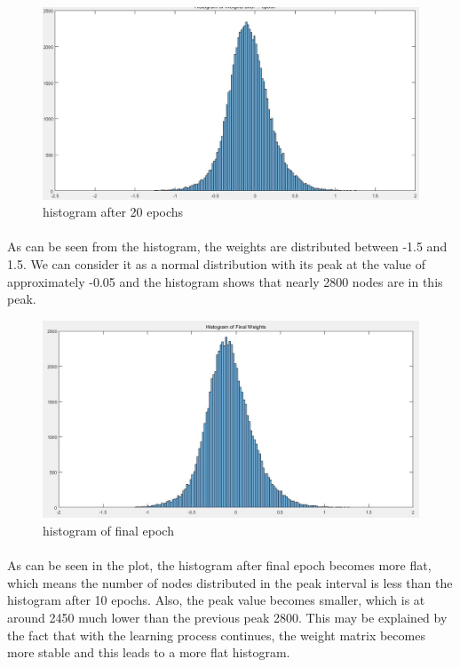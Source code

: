 \documentclass{article}
\begin{document}
 \begin{figure}[H]
 \centering
 \includegraphics[width=1.2\textwidth]{hist2.jpg}
 \caption{histogram after 20 epochs}\label{}
 \end{figure}
\paragraph{}
As can be seen from the histogram, the weights are distributed between -1.5 and 1.5. We can consider it as a normal distribution with its peak at the value of approximately -0.05 and the histogram shows that nearly 2800 nodes are in this peak.

  \begin{figure}[H]
 \centering
 \includegraphics[width=1.2\textwidth]{Finhist}
 \caption{histogram of final epoch}\label{}
 \end{figure}
\paragraph{}
As can be seen in the plot, the histogram after final epoch becomes more flat, which means the number of nodes distributed in the peak interval is less than the histogram after 10 epochs. Also, the peak value becomes smaller, which is at around 2450 much lower than the previous peak 2800. This may be explained by the fact that with the learning process continues, the weight matrix becomes more stable and this leads to a more flat histogram.
\end{document}
